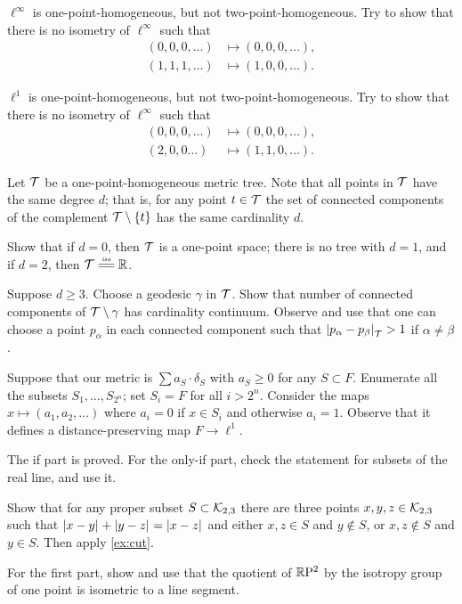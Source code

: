 $\ell^\infty$ is one-point-homogeneous, but not two-point-homogeneous.
Try to show that there is no isometry of $\ell^\infty$ such that
\begin{align*}
(0,0,0,\dots)&\mapsto (0,0,0,\dots),
\\
(1,1,1,\dots)&\mapsto (1,0,0,\dots).
\end{align*}

$\ell^1$ is one-point-homogeneous, but not two-point-homogeneous.
Try to show that there is no isometry of $\ell^\infty$ such that
\begin{align*}
(0,0,0,\dots)&\mapsto (0,0,0,\dots),
\\
(2,0,0\dots)&\mapsto (1,1,0,\dots).
\end{align*}

Let $\mathcal{T}$ be a one-point-homogeneous metric tree.
Note that all points in $\mathcal{T}$ have the same degree $d$;
that is, for any point $t\in \mathcal{T}$ the set of connected components of the complement $\mathcal{T}\setminus\{t\}$ has the same cardinality $d$.

Show that if $d=0$, then $\mathcal{T}$ is a one-point space;
there is no tree with $d=1$,
and if $d=2$, then $\spc{T}\iso\RR$.

Suppose $d\ge 3$.
Choose a geodesic $\gamma$ in $\mathcal{T}$.
Show that number of connected components of $\mathcal{T}\setminus\gamma$ has cardinality continuum.
Observe and use that one can choose a point $p_\alpha$ in each connected component such that $\dist{p_\alpha}{p_\beta}{\spc{T}}>1$ if $\alpha\ne\beta$.

Suppose that our metric is $\sum a_S\cdot\delta_S$ with $a_S\ge 0$ for any $S\subset F$.
Enumerate all the subsets $S_1,\dots,S_{2^n}$;
set $S_i=F$ for all $i>2^n$. 
Consider the maps $x\mapsto (a_1,a_2,\dots)$ where $a_i=0$ if $x\in S_i$ and otherwise $a_i=1$.
Observe that it defines a distance-preserving map $F\to \ell^1$. 

The if part is proved.
For the only-if part, check the statement for subsets of the real line, and use it.

Show that for any proper subset $S\subset \mathcal{K}_{2,3}$ there are three points $x,y,z\in \mathcal{K}_{2,3}$ such that $\dist{x}{y}{} +\dist{y}{z}{}=\dist{x}{z}{}$ and either 
$x,z\in S$ and $y\notin S$, or $x,z\notin S$ and $y\in S$.
Then apply \ref{ex:cut}.

For the first part, show and use that the quotient of $\mathbb{R}\mathrm{P}^2$ by the isotropy group of one point is isometric to a line segment.

